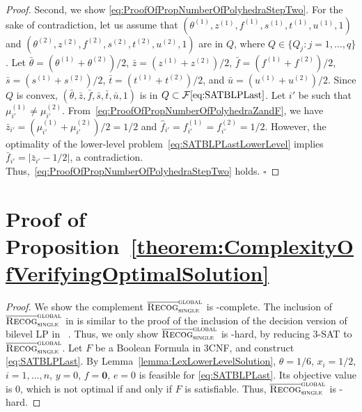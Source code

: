 \documentclass[runningheads,orivec]{llncs}
\newcommand{\MacroColor}[1]{#1}
\newcommand{\MyQED}{\mbox{}\hfill$\square$}
\newcommand{\ZeroVector}{\mathbf{0}}
\newcommand{\ComplexityClassStyle}[1]{#1}
\newcommand{\ClassNP}{\MacroColor{\text{\ComplexityClassStyle{NP}}}}
\newcommand{\ThreeSAT}{\MacroColor{\textsc{3-SAT}}}
\newcommand{\CompGlobalOptimalProblemName}{\MacroColor{$\overline{\textsc{Recog}}_{\textsc{single}}^{\textsc{global}}$}}
\newcommand{\CompGlobalOptimalProblem}{\hyperref[GlobalOptimalProblemAnchor]{\CompGlobalOptimalProblemName{}}}
\newcommand{\NVariables}{\MacroColor{n}}
\newcommand{\FeasSolSet}{\MacroColor{\mathcal{F}}}
\newcommand{\SATBooleanFormula}{\MacroColor{F}}
\newcommand{\ReformZ}{\MacroColor{z}}
\newcommand{\ReformAugFrac}{\MacroColor{f}}
\newcommand{\LexUVar}{\MacroColor{\theta}}
\newcommand{\LexLVarS}{\MacroColor{s}}
\newcommand{\LexLVarT}{\MacroColor{t}}
\newcommand{\LexLVarU}{\MacroColor{u}}
\newcommand{\BinaryVector}{\MacroColor{\mu}}
\begin{document}
\begin{appendix}
\begin{proof}
Second, we show \ref{eq:ProofOfPropNumberOfPolyhedraStepTwo}.
For the sake of contradiction, let us assume that $(\LexUVar^{(1)}, \ReformZ^{(1)}, \ReformAugFrac^{(1)}, \LexLVarS^{(1)}, \LexLVarT^{(1)}, \LexLVarU^{(1)}, 1)$ and $(\LexUVar^{(2)}, \ReformZ^{(2)}, \ReformAugFrac^{(2)}, \LexLVarS^{(2)}, \LexLVarT^{(2)}, \LexLVarU^{(2)}, 1)$ are in $Q$, where $Q \in \{ Q_j : j = 1, \ldots, q \}$.
Let $\bar{\LexUVar} = (\LexUVar^{(1)} + \LexUVar^{(2)}) / 2$, $\bar{\ReformZ} = (\ReformZ^{(1)} + \ReformZ^{(2)}) / 2$, $\bar{\ReformAugFrac} = (\ReformAugFrac^{(1)} + \ReformAugFrac^{(2)}) / 2$, $\bar{\LexLVarS} = (\LexLVarS^{(1)} + \LexLVarS^{(2)}) / 2$, $\bar{\LexLVarT} = (\LexLVarT^{(1)} + \LexLVarT^{(2)}) / 2$, and $\bar{\LexLVarU} = (\LexLVarU^{(1)} + \LexLVarU^{(2)}) / 2$.
Since $Q$ is convex, $(\bar{\LexUVar}, \bar{\ReformZ}, \bar{\ReformAugFrac}, \bar{\LexLVarS}, \bar{\LexLVarT}, \bar{\LexLVarU}, 1)$ is in $Q \subset \FeasSolSet\eqref{eq:SATBLPLast}$.
Let $i'$ be such that $\BinaryVector^{(1)}_{i'} \ne \BinaryVector^{(2)}_{i'}$.
From~\eqref{eq:ProofOfPropNumberOfPolyhedraZandF}, we have $\bar{\ReformZ}_{i'} = (\BinaryVector^{(1)}_{i'} + \BinaryVector^{(2)}_{i'}) / 2 = 1/2$ and $\hat{\ReformAugFrac}_{i'} = \ReformAugFrac^{(1)}_{i'} = \ReformAugFrac^{(2)}_{i'} = 1/2$.
However, the optimality of the lower-level problem~\eqref{eq:SATBLPLastLowerLevel} implies $\bar{\ReformAugFrac}_{i'} = | \bar{\ReformZ}_{i'} - 1/2 |$, a contradiction.
Thus,~\ref{eq:ProofOfPropNumberOfPolyhedraStepTwo} holds.
\MyQED
\end{proof}

\section{Proof of Proposition~\ref{theorem:ComplexityOfVerifyingOptimalSolution}}
\label{sec:ProofOfTheoremComplexityOfVerifyingOptimalSolution}

\begin{proof}
We show the complement \CompGlobalOptimalProblem{} is \ClassNP{}-complete.
The inclusion of \CompGlobalOptimalProblem{} in \ClassNP{} is similar to the proof of the inclusion of the decision version of bilevel LP in \ClassNP{}~\cite{Buchheim2023}.
Thus, we only show \CompGlobalOptimalProblem{} is \ClassNP{}-hard, by reducing \ThreeSAT{} to \CompGlobalOptimalProblem{}.
Let $\SATBooleanFormula$ be a Boolean Formula in 3CNF, and construct \eqref{eq:SATBLPLast}.
By Lemma~\ref{lemma:LexLowerLevelSolution}, $\LexUVar = 1/6$, $x_i = 1/2$, $i = 1, \ldots, \NVariables$, $y = 0$, $f = \ZeroVector$, $e = 0$ is feasible for \eqref{eq:SATBLPLast}.
Its objective value is $0$, which is not optimal if and only if  $\SATBooleanFormula$ is satisfiable.
Thus, \CompGlobalOptimalProblem{} is \ClassNP{}-hard.


\end{proof}
\end{appendix}
\end{document}
